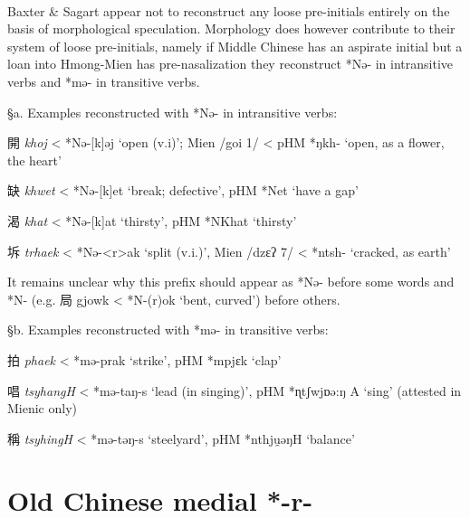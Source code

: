 \paragraph{}Baxter \& Sagart appear not to reconstruct any loose pre-initials
entirely on the basis of morphological speculation. Morphology does
however contribute to their system of loose pre-initials, namely if
Middle Chinese has an aspirate initial but a loan into Hmong-Mien has
pre-nasalization they reconstruct *Nə- in intransitive verbs and *mə- in
transitive verbs.

§a. Examples reconstructed with *Nə- in intransitive verbs:

\begin{description} \item
開 \emph{khoj} \textless{} *Nə-{[}k]{}{}əj `open (v.i)'; Mien /goi 1/
\textless{} pHM *ŋkh- `open, as a flower, the heart'
\item
缺 \emph{khwet} \textless{} *Nə-{[}k]{}et `break; defective', pHM
*N{}et `have a gap'
\item
渴 \emph{khat} \textless{} *Nə-{[}k]{}{}at `thirsty', pHM *NKhat
`thirsty'
\item
坼 \emph{trhaek} \textless{} *Nə-{}{}\textless{}r\textgreater{}ak `split
(v.i.)', Mien /dzɛʔ 7/ \textless{} *ntsh- `cracked, as earth'
\end{description}

It remains unclear why this prefix should appear as *Nə- before some
words and *N- (e.g. 局 gjowk \textless{} *N-{}(r)ok `bent, curved')
before others.

§b. Examples reconstructed with *mə- in transitive verbs:

\begin{description} \item
拍 \emph{phaek} \textless{} *mə-p{}{}rak `strike', pHM *mpjɛk `clap'
\item
唱 \emph{tsyhangH} \textless{} *mə-t{}aŋ-s `lead (in singing)', pHM
*ɳtʃwjɒə:ŋ A `sing' (attested in Mienic only)
\item
稱 \emph{tsyhingH} \textless{} *mə-t{}əŋ-s `steelyard', pHM *nthju̯əŋH
`balance'
\end{description}

\section{\texorpdfstring{\textbf{Old Chinese medial
*-r-}}{Old Chinese medial *-r-}}

